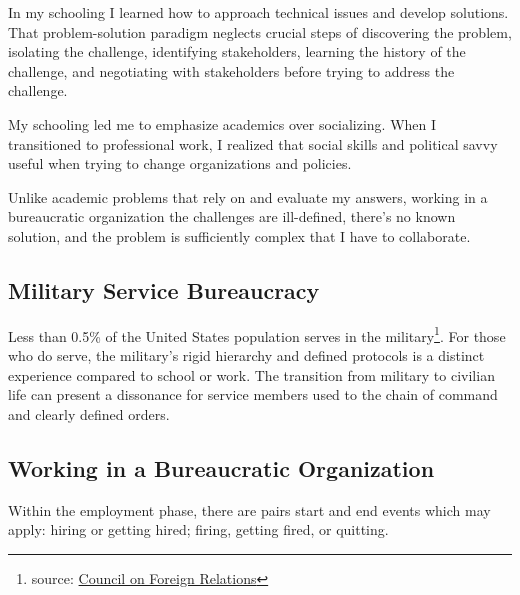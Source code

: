 
In my schooling I learned how to approach technical issues and develop solutions. That problem-solution paradigm neglects crucial steps of discovering the problem, isolating the challenge, identifying stakeholders, learning the history of the challenge, and negotiating with stakeholders before trying to address the challenge. 

My schooling led me to emphasize academics over socializing. When I transitioned to professional work, I realized that social skills and political savvy useful when trying to change organizations and policies. 

Unlike academic problems that rely on and evaluate my answers, working in a bureaucratic organization the challenges are ill-defined, there's no known solution, and the problem is sufficiently complex that I have to collaborate.







\subsection*{Military Service Bureaucracy\label{bureaucracy-of-military}}
Less than 0.5\% of the United States population serves in the military\footnote{source: \href{https://www.cfr.org/backgrounder/demographics-us-military}{Council on Foreign Relations}}. For those who do serve, the military's rigid hierarchy and defined protocols is a distinct experience compared to school or work. The transition from military to civilian life can present a dissonance for service members used to the chain of command and clearly defined orders. 

\subsection*{Working in a Bureaucratic Organization\label{sec:bureaucracy-of-work}}
Within the employment phase, there are pairs start and end events which may apply: hiring or getting hired; firing, getting fired, or quitting. 

